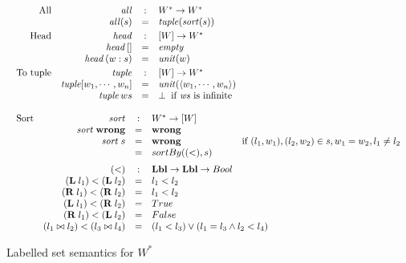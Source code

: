 \documentclass[acmsmall,review,dvipsnames]{acmart}
\newcommand{\Varid}[1]{\mathit{#1}}
\newcommand{\tuple}[1]{\langle #1 \rangle}
\newcommand{\Value}{W}
\newcommand{\mtype}{\Value^{*}}
\newcommand{\mempty}{\mathit{empty}}
\newcommand{\munit}{\mathit{unit}}
\newcommand{\munits}[1]{\munit(#1)}
\newcommand{\mall}{\mathit{all}}
\newcommand{\msucceeds}{\mathit{succeeds}}
\newcommand{\mdecides}{\mathit{decides}}
\newcommand{\wrong}{\mathbf{wrong}}
\begin{document}
\begin{figure}
$$\begin{array}{l}
\begin{array}{rrcll}
\text{All}  & \mall & : & \mtype \rightarrow \mtype \\
 & \mall(s) & = & \stuple (\msort( s) ) \\[1mm]
\text{Head}  & \shead & : & [\Value] \rightarrow \mtype \\
             & \shead\, [] & = & \mempty \\
             & \shead\, (w \scons s) & = & \munits{w} \\[1mm]
\text{To tuple} & \stuple & : & [\Value] \rightarrow \mtype \\
     & \stuple [w_1, \cdots, w_n] & = & \munits{\tuple{w_1,\cdots,w_n}} \\
     & \stuple \, ws & = & \bot \;\; \text{if \ensuremath{\Varid{ws}} is infinite} \\
  \end{array} \\
\\
\begin{array}{rrcll}
\text{Sort} & \msort & : & \mtype \rightarrow [\Value] \\
& \msort\;\wrong & = & \wrong \\
& \msort\;s & = & \wrong  & \text{if $(l_1,w_1), (l_2,w_2) \in s, w_1 = w_2, l_1 \not= l_2$} \\
& &=& sortBy( (<), s ) \\[2mm]
& (<) & : & \Lbl \rightarrow \Lbl\rightarrow Bool \\
& (\lbll l_1) < (\lbll l_2) & = & l_1 < l_2 \\
& (\lblr l_1) < (\lblr l_2) & = & l_1 < l_2 \\
& (\lbll l_1) < (\lblr l_2) & = & True \\
& (\lblr l_1) < (\lbll l_2) & = & False \\
& (\lblseq{l_1}{l_2}) < (\lblseq{l_3}{l_4}) & = &
\multicolumn{2}{l}{(l_1 < l_3) \vee (l_1 = l_3 \wedge l_2 < l_4)}\\
\end{array}

\end{array}
$$
\caption{Labelled set semantics for $\mtype$}
\label{fig:labelled-sem}
\end{figure}
\end{document}

